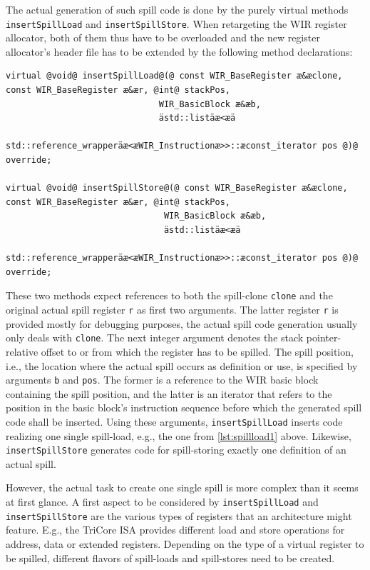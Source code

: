 The actual generation of such spill code is done by the purely virtual methods \texttt{insertSpillLoad} and \texttt{insert\-SpillStore}.
When retargeting the \gls{WIR} register allocator, both of them thus have to be overloaded and the new register allocator's header file has to be extended by the following method declarations: \\
\begin{lstlisting}[style=code,float=!ht,aboveskip=-0.8 \baselineskip,belowskip=-0.8 \baselineskip]
virtual @void@ insertSpillLoad@(@ const WIR_BaseRegister æ&æclone, const WIR_BaseRegister æ&ær, @int@ stackPos,
                              WIR_BasicBlock æ&æb,
                              ästd::listäæ<æä
                                std::reference_wrapperäæ<æWIR_Instructionæ>>::æconst_iterator pos @)@ override;

virtual @void@ insertSpillStore@(@ const WIR_BaseRegister æ&æclone, const WIR_BaseRegister æ&ær, @int@ stackPos,
                               WIR_BasicBlock æ&æb,
                               ästd::listäæ<æä
                                 std::reference_wrapperäæ<æWIR_Instructionæ>>::æconst_iterator pos @)@ override;
\end{lstlisting}

These two methods expect references to both the spill-clone \texttt{clone} and the original actual spill register \texttt{r} as first two arguments.
The latter register \texttt{r} is provided mostly for debugging purposes, the actual spill code generation usually only deals with \texttt{clone}.
The next integer argument denotes the stack pointer-relative offset to or from which the register has to be spilled.
The spill position, i.e., the location where the actual spill occurs as definition or use, is specified by arguments \texttt{b} and \texttt{pos}.
The former is a reference to the \gls{WIR} basic block containing the spill position, and the latter is an iterator that refers to the position in the basic block's instruction sequence before which the generated spill code shall be inserted.
Using these arguments, \texttt{insertSpillLoad} inserts code realizing one single spill-load, e.g., the one from \cref{lst:spillload1} above.
Likewise, \texttt{insertSpillStore} generates code for spill-storing exactly one definition of an actual spill.

However, the actual task to create one single spill is more complex than it seems at first glance.
A first aspect to be considered by \texttt{insertSpillLoad} and \texttt{insertSpillStore} are the various types of registers that an architecture might feature.
E.g., the TriCore \gls{ISA} provides different load and store operations for address, data or extended registers.
Depending on the type of a virtual register to be spilled, different flavors of spill-loads and spill-stores need to be created.

